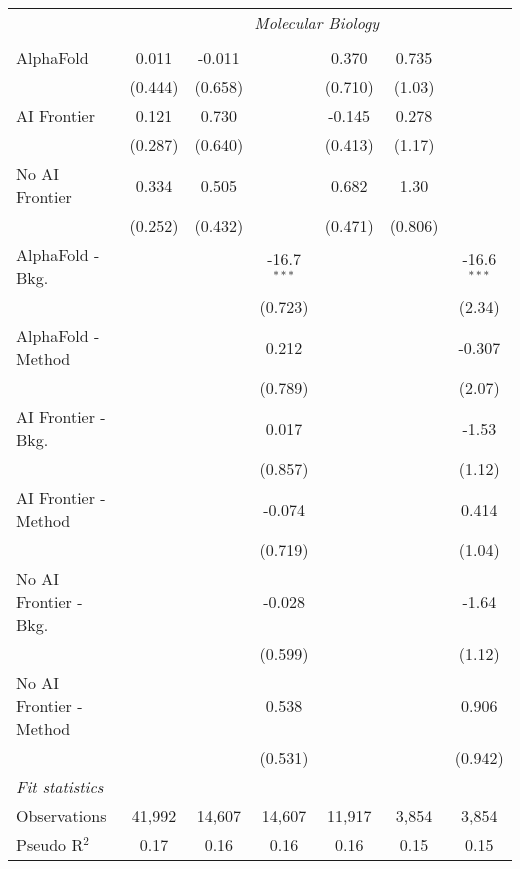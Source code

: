 \begin{tabular}{lcccccc}
 & \multicolumn{6}{c}{\textit{Molecular Biology}} \\ \\
   AlphaFold               & 0.011   & -0.011  &               & 0.370   & 0.735   &   \\   
                           & (0.444) & (0.658) &               & (0.710) & (1.03)  &   \\   
   AI Frontier             & 0.121   & 0.730   &               & -0.145  & 0.278   &   \\   
                           & (0.287) & (0.640) &               & (0.413) & (1.17)  &   \\   
   No AI Frontier          & 0.334   & 0.505   &               & 0.682   & 1.30    &   \\   
                           & (0.252) & (0.432) &               & (0.471) & (0.806) &   \\   
   AlphaFold - Bkg.        &         &         & -16.7$^{***}$ &         &         & -16.6$^{***}$\\   
                           &         &         & (0.723)       &         &         & (2.34)\\   
   AlphaFold - Method      &         &         & 0.212         &         &         & -0.307\\   
                           &         &         & (0.789)       &         &         & (2.07)\\   
   AI Frontier - Bkg.      &         &         & 0.017         &         &         & -1.53\\   
                           &         &         & (0.857)       &         &         & (1.12)\\   
   AI Frontier - Method    &         &         & -0.074        &         &         & 0.414\\   
                           &         &         & (0.719)       &         &         & (1.04)\\   
   No AI Frontier - Bkg.   &         &         & -0.028        &         &         & -1.64\\   
                           &         &         & (0.599)       &         &         & (1.12)\\   
   No AI Frontier - Method &         &         & 0.538         &         &         & 0.906\\   
                           &         &         & (0.531)       &         &         & (0.942)\\   
   \midrule
   \emph{Fit statistics}\\
   Observations            & 41,992  & 14,607  & 14,607        & 11,917  & 3,854   & 3,854\\  
   Pseudo R$^2$            & 0.17    & 0.16    & 0.16          & 0.16    & 0.15    & 0.15\\  
   

\end{tabular}
